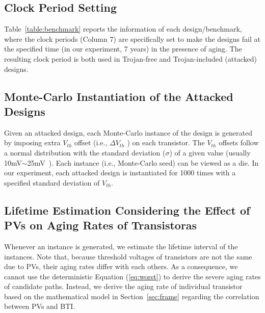 \subsection{Clock Period Setting}
\label{sec:exp:tc}
Table~\ref{table:benchmark} reports the information of each design/benchmark, where the clock periods (Column 7) are specifically set to make the designs fail at the specified time (in our experiment, 7 years) in the presence of aging. The resulting clock period is both used in Trojan-free and Trojan-included (attacked) designs. 
\subsection{Monte-Carlo Instantiation of the Attacked Designs}
\label{sec:ins:mc_ins}
Given an attacked design, each Monte-Carlo instance of the design is generated by imposing extra $V_{th}$ offset (i.e., $\Delta V_{th}$ ) on each transistor. The $V_{th}$ offsets follow a normal distribution with the standard deviation ($\sigma$) of a given value (usually 10mV$\sim$25mV~\cite{han2011statistical}\cite{schlunder2017influence}). Each instance (i.e., Monte-Carlo seed) can be viewed as a die. In our experiment, each attacked design is instantiated for 1000 times with a specified standard deviation of $V_{th}$. 

\subsection{Lifetime Estimation Considering the Effect of PVs on Aging Rates of Transistoras}
\label{sec:ins:lt}
Whenever an instance is generated, we estimate the lifetime interval of the instances. Note that, because threshold voltages of transistors are not the same due to PVs, their aging rates differ with each others. As a consequence, we cannot use the deterministic Equation (\ref{eq:worst}) to derive the severe aging rates of candidate paths. Instead, we derive the aging rate of individual transistor based on the mathematical model in Section~\ref{sec:frame} regarding the correlation between PVs and BTI.

